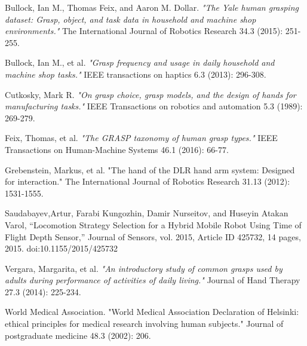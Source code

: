 \documentclass[journal]{IEEEtran}
\begin{document}
\begin{thebibliography}{5}

Bullock, Ian M., Thomas Feix, and Aaron M. Dollar. \emph{"The Yale human grasping dataset: Grasp, object, and task data in household and machine shop environments."} The International Journal of Robotics Research 34.3 (2015): 251-255.

Bullock, Ian M., et al. \emph{"Grasp frequency and usage in daily household and machine shop tasks."} IEEE transactions on haptics 6.3 (2013): 296-308.

Cutkosky, Mark R. \emph{"On grasp choice, grasp models, and the design of hands for manufacturing tasks."} IEEE Transactions on robotics and automation 5.3 (1989): 269-279.

Feix, Thomas, et al. \emph{"The GRASP taxonomy of human grasp types."} IEEE Transactions on Human-Machine Systems 46.1 (2016): 66-77.


Grebenstein, Markus, et al. "The hand of the DLR hand arm system: Designed for interaction." The International Journal of Robotics Research 31.13 (2012): 1531-1555.

Saudabayev,Artur, Farabi Kungozhin, Damir Nurseitov, and Huseyin Atakan Varol, “Locomotion Strategy Selection for a Hybrid Mobile Robot Using Time of Flight Depth Sensor,” Journal of Sensors, vol. 2015, Article ID 425732, 14 pages, 2015. doi:10.1155/2015/425732


Vergara, Margarita, et al. \emph{"An introductory study of common grasps used by adults during performance of activities of daily living."} Journal of Hand Therapy 27.3 (2014): 225-234.

World Medical Association. "World Medical Association Declaration of Helsinki: ethical principles for medical research involving human subjects." Journal of postgraduate medicine 48.3 (2002): 206.


\end{thebibliography}
\end{document}
